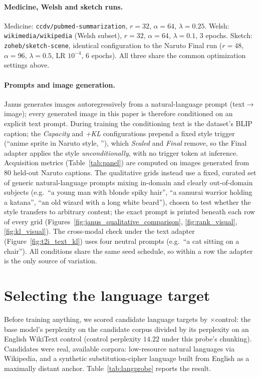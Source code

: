 \paragraph{Medicine, Welsh and sketch runs.}
Medicine: \texttt{ccdv/pubmed-summarization}, $r{=}32$, $\alpha{=}64$,
$\lambda{=}0.25$. Welsh: \texttt{wikimedia/wikipedia} (Welsh subset), $r{=}32$,
$\alpha{=}64$, $\lambda{=}0.1$, $3$ epochs. Sketch: \texttt{zoheb/sketch-scene},
identical configuration to the Naruto Final run ($r{=}48$, $\alpha{=}96$,
$\lambda{=}0.5$, LR $10^{-4}$, $6$ epochs). All three share the common
optimization settings above.

\paragraph{Prompts and image generation.}
Janus generates images autoregressively from a natural-language prompt
(text$\to$image); every generated image in this paper is therefore conditioned on
an explicit text prompt. During training the conditioning text is the dataset's
BLIP caption; the \textit{Capacity} and \textit{+KL} configurations prepend a
fixed style trigger (``anime sprite in Naruto style, ''), which \textit{Scaled}
and \textit{Final} remove, so the Final adapter applies the style
\emph{unconditionally}, with no trigger token at inference. Acquisition metrics
(Table~\ref{tab:panel}) are computed on images generated from $80$ held-out Naruto
captions. The qualitative grids instead use a fixed, curated set of generic
natural-language prompts mixing in-domain and clearly out-of-domain subjects
(e.g.\ ``a young man with blonde spiky hair'', ``a samurai warrior holding a
katana'', ``an old wizard with a long white beard''), chosen to test whether the
style transfers to arbitrary content; the exact prompt is printed beneath each row
of every grid (Figures~\ref{fig:janus_qualitative_comparison},
\ref{fig:rank_visual}, \ref{fig:kl_visual}). The cross-modal check under the text
adapter (Figure~\ref{fig:t2i_text_kl}) uses four neutral prompts (e.g.\ ``a cat
sitting on a chair''). All conditions share the same seed schedule, so within a
row the adapter is the only source of variation.


\section{Selecting the language target}
\label{app:langprobe}
Before training anything, we scored candidate language targets by
$\times$control: the base model's perplexity on the candidate corpus divided by
its perplexity on an English WikiText control (control perplexity $14.22$ under
this probe's chunking). Candidates were real, available corpora: low-resource
natural languages via Wikipedia, and a synthetic substitution-cipher language
built from English as a maximally distant anchor. Table~\ref{tab:langprobe}
reports the result.

